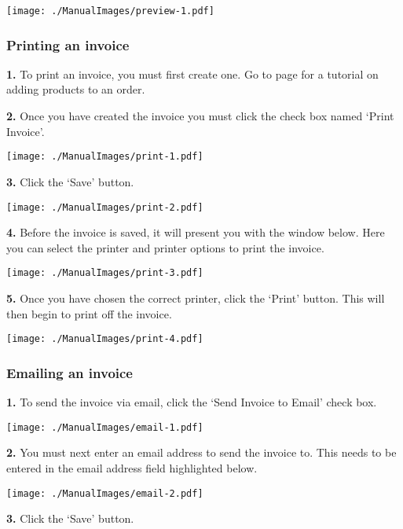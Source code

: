 \texttt{[image: ./ManualImages/preview-1.pdf]}

\pagebreak
\subsubsection{Printing an invoice}
\label{fig:Printing an invoice}

\textbf{1.} To print an invoice, you must first create one. Go to page \pageref{fig:Adding products to an order} for a tutorial on adding products to an order.

\textbf{2.} Once you have created the invoice you must click the check box named `Print Invoice'.

\texttt{[image: ./ManualImages/print-1.pdf]}

\pagebreak

\textbf{3.} Click the `Save' button.

\texttt{[image: ./ManualImages/print-2.pdf]}

\pagebreak

\textbf{4.} Before the invoice is saved, it will present you with the window below. Here you can select the printer and printer options to print the invoice.

\texttt{[image: ./ManualImages/print-3.pdf]}

\pagebreak

\textbf{5.} Once you have chosen the correct printer, click the `Print' button. This will then begin to print off the invoice.

\texttt{[image: ./ManualImages/print-4.pdf]}

\pagebreak
\subsubsection{Emailing an invoice}
\label{fig:Emailing an invoice}

\textbf{1.} To send the invoice via email, click the `Send Invoice to Email' check box.

\texttt{[image: ./ManualImages/email-1.pdf]}

\textbf{2.} You must next enter an email address to send the invoice to. This needs to be entered in the email address field highlighted below.

\texttt{[image: ./ManualImages/email-2.pdf]}

\pagebreak

\textbf{3.} Click the `Save' button.

